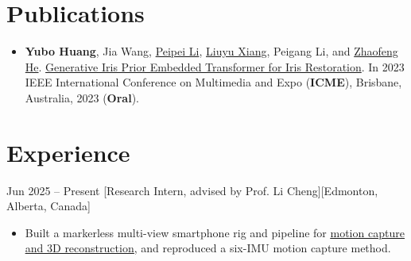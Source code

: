 \documentclass{chicv}
\begin{document}
\section{Publications}

\begin{itemize}
  \item \textbf{Yubo Huang}, Jia Wang, \href{https://teacher.bupt.edu.cn/lipeipei/en/index/241243/list/index.htm}{Peipei Li}, \href{https://teacher.bupt.edu.cn/xiangliuyu/en/lwcg/255396/list/index.htm}{Liuyu Xiang}, Peigang Li, and \href{https://teacher.bupt.edu.cn/hezhaofeng/en/lwcg/206617/list/index.htm}{Zhaofeng He}. \href{https://scholar.google.ca/scholar?q=Generative+Iris+Prior+Embedded+Transformer+for+Iris+Restoration.&hl=en&as_sdt=0&as_vis=1&oi=scholart}{Generative Iris Prior Embedded Transformer for Iris Restoration}. In 2023 IEEE International Conference on Multimedia and Expo (\textbf{ICME}), Brisbane, Australia, 2023 (\textbf{Oral}).
\end{itemize}

\section{Experience}

  {Jun 2025 -- Present}
  [Research Intern, advised by Prof. Li Cheng][Edmonton, Alberta, Canada]
  \begin{itemize}
    \item Built a markerless multi-view smartphone rig and pipeline for \href{https://huangyubo.gitlab.io/motion-capture.html}{\underline{motion capture and 3D reconstruction}}, and reproduced a six-IMU motion capture method.
  \end{itemize}
\end{document}

